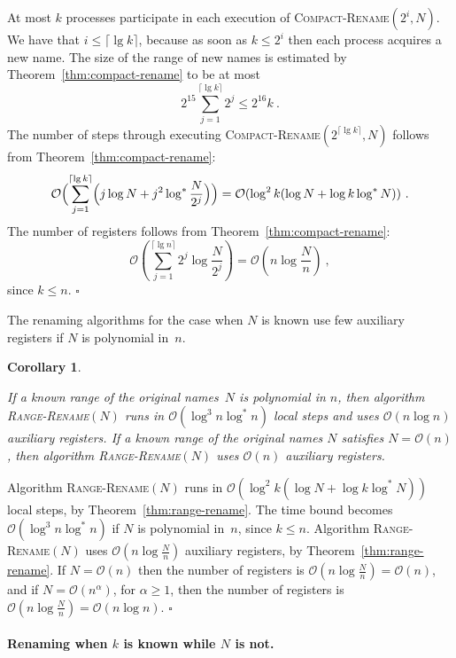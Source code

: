 \documentclass[11pt]{article}
\newcommand{\BBB}{\vspace*{-\bigskipamount}}
\newcommand{\cO}{\mathcal{O}}
\newcommand{\Paragraph}[1]{\BBB\paragraph{#1}}
\newcommand{\qed}{\hfill $\square$ \smallbreak}
\newenvironment{proof}{\noindent{\bf Proof:}}{\qed}
\newtheorem{corollary}{Corollary}
\begin{document}
\begin{proof}
At most $k$ processes participate in each execution of \textsc{Compact-Rename}$(2^i,N)$. We have that  $i\le \lceil \lg k\rceil$, because as soon as $k\le 2^i$ then each process acquires a new name.
The size of the range of new names is estimated by Theorem~\ref{thm:compact-rename} to be at most 
\[
2^{15}\sum_{j=1}^{\lceil \lg k\rceil} 2^j\le 2^{16} k
\ .
\]
The number of steps through executing  \textsc{Compact-Rename}$(2^{\lceil\lg k\rceil},N)$ follows from Theorem~\ref{thm:compact-rename}:
\[
\cO\Bigl(\sum_{j=1}^{\lceil\lg k\rceil} \Bigl(j\log N +j^2\log^* \frac{N}{2^j}\Bigr) \Bigr) =
\cO(\log^2 k (\log N + \log k \log^\ast N))
\ .
\]
The number of registers follows from Theorem~\ref{thm:compact-rename}:
\[
\cO\left(\sum_{j=1}^{\lceil\lg n\rceil} 2^j\log\frac{N}{2^j}\right) =\cO\left(n\log\frac{N}{n}\right)
\ , 
\]
 since $k\le n$.
\end{proof}


The renaming algorithms for the case when $N$ is known use few auxiliary registers if $N$ is   polynomial in~$n$.




\begin{corollary}
\label{cor:only-known-N-rename}

If a known range of the original names~$N$ is polynomial in $n$, then algorithm   \textsc{Range-Rename}$(N)$ runs in $\cO(\log^3 n \log^\ast n)$ local steps and uses $\cO(n\log n)$ auxiliary registers. 
If a known range of the original names $N$ satisfies $N=\cO(n)$, then algorithm  \textsc{Range-Rename}$(N)$ uses  $\cO(n)$ auxiliary registers. 
\end{corollary}

\begin{proof}
Algorithm \textsc{Range-Rename}$(N)$ runs in $\cO(\log^2 k (\log N + \log k\log^\ast N))$ local steps, by Theorem~\ref{thm:range-rename}.
The time bound becomes $\cO(\log^3 n \log^\ast n)$ if $N$ is polynomial in~$n$, since $k\le n$.
Algorithm \textsc{Range-Rename}$(N)$ uses $\cO(n\log\frac{N}{n})$ auxiliary registers, by Theorem~\ref{thm:range-rename}.
If $N=\cO(n)$ then the number of registers is $\cO(n\log\frac{N}{n})=\cO(n)$, and if $N=\cO(n^\alpha)$, for $\alpha\ge 1$, then the number of registers is $\cO(n\log\frac{N}{n})=\cO(n\log n)$.
\end{proof}




\Paragraph{Renaming when $k$ is known while $N$ is not.}
\end{document}
